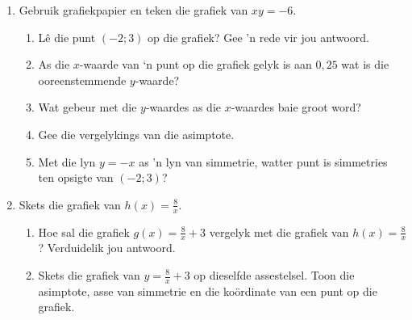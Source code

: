 \begin{exercises}{}
{
\begin{enumerate}[noitemsep, label=\textbf{\arabic*}. ] 
\item Gebruik grafiekpapier en teken die grafiek van  $xy=-6$.
    \begin{enumerate}[noitemsep, label=\textbf{(\alph*)} ] 
    \item Lê die punt $(-2; 3)$  op die grafiek? Gee ’n rede vir jou antwoord.
    \item As die $x$-waarde van ‘n punt op die grafiek gelyk is aan $0,25$ wat is die ooreenstemmende $y$-waarde?
    \item Wat gebeur met die $y$-waardes as die $x$-waardes baie groot word?
    \item Gee die vergelykings van die asimptote.
    \item Met die lyn $y=-x$ as ’n lyn van simmetrie, watter punt is simmetries ten opsigte van $(-2; 3)$?
    \end{enumerate}
\item Skets die grafiek van  $h(x)=\frac{8}{x}$.
    \begin{enumerate}[noitemsep, label=\textbf{(\alph*)} ] 
    \item Hoe sal die grafiek $g(x)=\frac{8}{x}+3$ vergelyk met die grafiek van $h(x)=\frac{8}{x}$? Verduidelik jou antwoord.
    \item Skets die grafiek van $y=\frac{8}{x}+3$ op dieselfde assestelsel. Toon die asimptote, asse van simmetrie en die ko\"ordinate van een punt op die grafiek.
    \end{enumerate}
 \end{enumerate}

}
\end{exercises}


